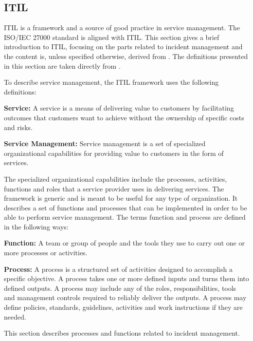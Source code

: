 \subsection{ITIL}
\ac{ITIL} is a framework and a source of good practice in service management. The \acs{ISO}/\acs{IEC} 27000 standard is aligned with \ac{ITIL}. This section gives a brief introduction to \ac{ITIL}, focusing on the parts related to incident management and the content is, unless specified otherwise, derived from \cite{itilbok}. The definitions presented in this section are taken directly from \cite{itilbok}.

To describe service management, the \ac{ITIL} framework uses the following definitions:

\textbf{Service:} A service is a means of delivering value to customers by facilitating outcomes that customers want to achieve without the ownership of specific costs and risks.

\textbf{Service Management:} Service management is a set of specialized organizational capabilities for providing value to customers in the form of services.

The specialized organizational capabilities include the processes, activities, functions and roles that a service provider uses in delivering services. The framework is generic and is meant to be useful for any type of organization. It describes a set of functions and processes that can be implemented in order to be able to perform service management. The terms function and process are defined in the following ways:

\textbf{Function:} A team or group of people and the tools they use to carry out one or more processes or activities.

\textbf{Process:} A process is a structured set of activities designed to accomplish a specific objective. A process takes one or more defined inputs and turns them into defined outputs. A process may include any of the roles, responsibilities, tools and management controls required to reliably deliver the outputs. A process may define policies, standards, guidelines, activities and work instructions if they are needed.


This section describes processes and functions related to incident management.

